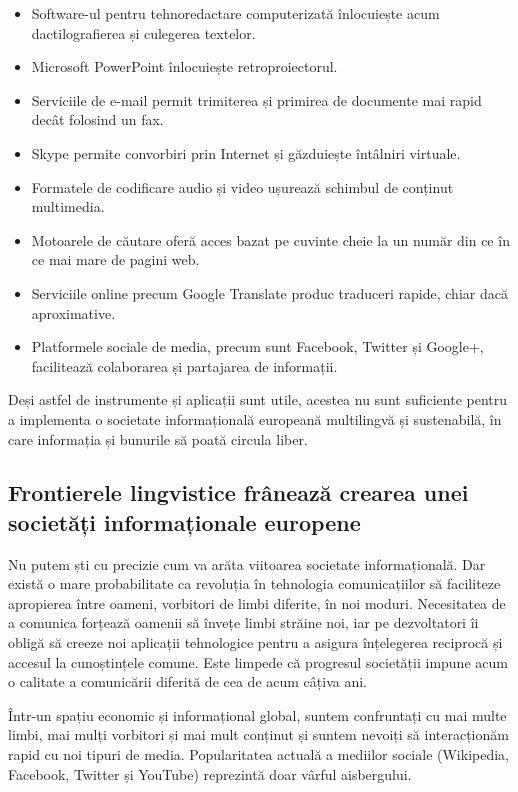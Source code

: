 \begin{multicols}{2}
\begin{itemize}
\item Software-ul pentru tehnoredactare computerizată înlocuiește acum dactilografierea și culegerea textelor.
\item Microsoft PowerPoint înlocuiește retroproiectorul.
\item Serviciile de e-mail permit trimiterea și primirea de documente mai rapid decât folosind un fax.
\item Skype permite convorbiri prin Internet și găzduiește întâlniri virtuale.
\item Formatele de codificare audio și video ușurează schimbul de conținut multimedia.
\item Motoarele de căutare oferă acces bazat pe cuvinte cheie la un număr din ce în ce mai mare de pagini web.
\item Serviciile online precum Google Translate produc traduceri rapide, chiar dacă aproximative.
\item Platformele sociale de media, precum sunt Facebook, Twitter și Google+, facilitează colaborarea și partajarea de informații.
\end{itemize}

Deși astfel de instrumente și aplicații sunt utile, acestea nu sunt suficiente pentru a implementa o societate informațională europeană multilingvă și sustenabilă, în care informația și bunurile să poată circula liber.

\subsection{Frontierele lingvistice frânează crearea unei societăți informaționale europene}

Nu putem ști cu precizie cum va arăta viitoarea societate informațională. Dar există o mare probabilitate ca revoluția în tehnologia comunicațiilor să faciliteze apropierea între oameni, vorbitori de limbi diferite, în noi moduri. Necesitatea de a comunica forțează oamenii să învețe limbi străine noi, iar pe dezvoltatori îi obligă să creeze noi aplicații tehnologice pentru a asigura înțelegerea reciprocă și accesul la cunoștințele comune. Este limpede că progresul societății impune acum o calitate a comunicării diferită de cea de acum câțiva ani. 


Într-un spațiu economic și informațional global, suntem confruntați cu mai multe limbi, mai mulți vorbitori și mai mult conținut și suntem nevoiți să interacționăm rapid cu noi tipuri de media. Popularitatea actuală a mediilor sociale (Wikipedia, Facebook, Twitter și YouTube) reprezintă doar vârful aisbergului.


\end{multicols}
